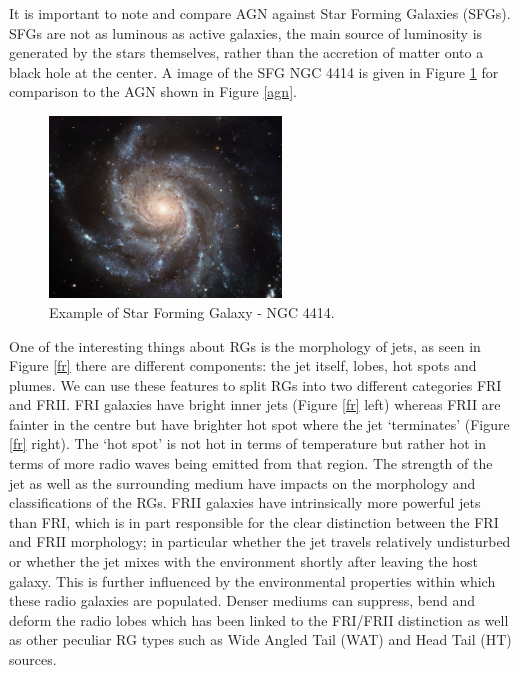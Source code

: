 \documentclass[a4paper, 10pt]{article}
\begin{document}
It is important to note and compare AGN against Star Forming Galaxies (SFGs). SFGs are not as luminous as active galaxies, the main source of luminosity is generated by the stars themselves, rather than the accretion of matter onto a black hole at the center. A image of the SFG NGC 4414 is given in Figure \ref{sfg} for comparison to the AGN shown in Figure \ref{agn}.
\begin{figure}[H]
\begin{center}
	\includegraphics[width=0.55\textwidth]{M101}
	\caption{Example of Star Forming Galaxy - NGC 4414\footnotemark.}
	\label{sfg}
\end{center}
\end{figure}
One of the interesting things about RGs is the morphology of jets, as seen in Figure \ref{fr} there are different components: the jet itself, lobes, hot spots and plumes. We can use these features to split RGs into two different categories FRI and FRII. FRI galaxies have bright inner jets (Figure \ref{fr} left) whereas FRII are fainter in the centre but have brighter hot spot where the jet `terminates' (Figure \ref{fr} right). The `hot spot' is not hot in terms of temperature but rather hot in terms of more radio waves being emitted from that region. The strength of the jet as well as the surrounding medium have impacts on the morphology and classifications of the RGs. FRII galaxies have intrinsically more powerful jets than FRI, which is in part responsible for the clear distinction between the FRI and FRII morphology; in particular whether the jet travels relatively undisturbed or whether the jet mixes with the environment shortly after leaving the host galaxy. This is further influenced by the environmental properties within which these radio galaxies are populated. Denser mediums can suppress, bend and deform the radio lobes which has been linked to the FRI/FRII distinction as well as other peculiar RG types such as Wide Angled Tail (WAT) and Head Tail (HT) sources.
\end{document}
